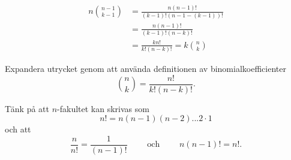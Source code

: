 \documentclass[nobib]{tufte-handout}
\begin{document}
\begin{solution}
	\begin{align*}
		n \binom{n-1}{k-1} &= \frac{n(n-1)!}{(k-1)!(n-1-(k-1))!}\\
		&= \frac{n(n-1)!}{(k-1)!(n-k)!}\\
		&= \frac{k n!}{k!(n-k)!} = k\binom{n}{k}	
	\end{align*}
    
	\begin{tips}
		Expandera utrycket genom att använda definitionen av binomialkoefficienter
		$$\binom{n}{k} = \frac{n!}{k!(n-k)!}.$$

		Tänk på att $n$-fakultet kan skrivas som
		$$n! = n(n-1)(n-2)...2\cdot 1$$ 
		och att
		$$\frac{n}{n!} = \frac{1}{(n-1)!}\qquad\text{ och }\qquad n(n-1)! = n!.$$
	\end{tips}
\end{solution}
\end{document}
